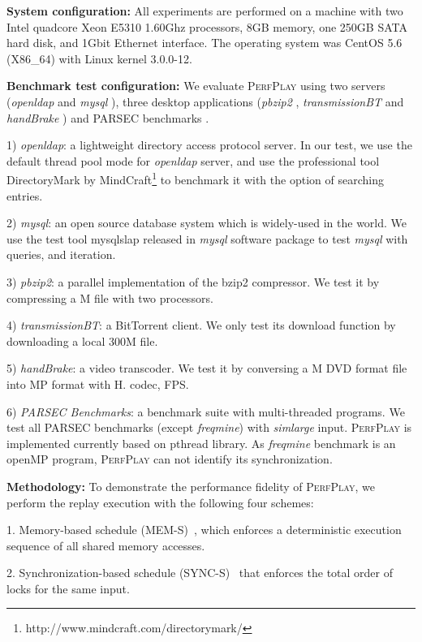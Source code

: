 \textbf{System configuration:} All experiments are performed on a machine with two Intel quadcore Xeon E5310 1.60Ghz processors, 8GB memory, one 250GB SATA hard disk, and 1Gbit Ethernet interface. The operating system was CentOS 5.6 (X86\_64) with Linux kernel 3.0.0-12.

\textbf{Benchmark test configuration:}
We evaluate \textsc{PerfPlay} using two servers (\emph{openldap} \cite{OpenLDAP} and \emph{mysql} \cite{mysql}), three desktop applications (\emph{pbzip2} \cite{pbzip2}, \emph{transmissionBT} \cite{transmissionbt} and \emph{handBrake} \cite{handbrake}) and PARSEC benchmarks \cite{parsec}. 

1) \emph{openldap}: a lightweight directory access protocol server. In our test, we use the default thread pool mode for \emph{openldap} server, and use the professional tool DirectoryMark by MindCraft\footnote{http://www.mindcraft.com/directorymark/} to benchmark it with the option of searching  entries.

2) \emph{mysql}: an open source database system which is widely-used in the world. We use the test tool mysqlslap released in \emph{mysql} software package to test \emph{mysql} with  queries, and  iteration.

3) \emph{pbzip2}: a parallel implementation of the bzip2 compressor. We test it by compressing a M file with two processors.

4) \emph{transmissionBT}: a BitTorrent client. We only test its download function by downloading a local 300M file.

5) \emph{handBrake}: a video transcoder. We test it by conversing a M  DVD format file into MP format with H. codec,  FPS.

6) \emph{PARSEC Benchmarks}: a benchmark suite with  multi-threaded programs. We test all PARSEC benchmarks (except \emph{freqmine}) with \emph{simlarge} input. \textsc{PerfPlay} is implemented currently based on \textsf{pthread} library. As \emph{freqmine} benchmark is an \textsf{openMP} program, \textsc{PerfPlay} can not identify its synchronization. 

\textbf{Methodology:} To demonstrate the performance fidelity of \textsc{PerfPlay}, we perform the replay execution with the following four schemes:


1. Memory-based schedule (MEM-S)~\cite{pinplay}, which enforces a deterministic execution sequence of all shared memory accesses.

2. Synchronization-based schedule (SYNC-S)~\cite{Kendo} that enforces the total order of locks for the same input.

